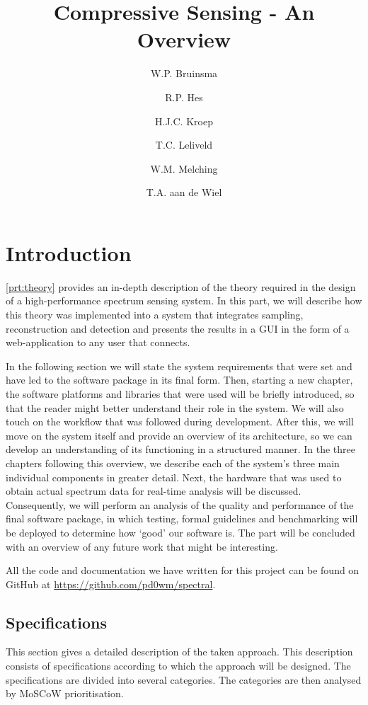 \documentclass[a4paper, openany, oneside]{memoir}
\title{Compressive Sensing - An Overview}
\author{W.P. Bruinsma \and R.P. Hes \and H.J.C. Kroep \and T.C. Leliveld \and W.M. Melching \and T.A. aan de Wiel}
\begin{document}
\chapter{Introduction}
\cref{prt:theory} provides an in-depth description of the theory required in the design of a high-performance spectrum sensing system.
In this part, we will describe how this theory was implemented into a system that integrates sampling, reconstruction and detection and presents the results in a GUI in the form of a web-application to any user that connects.

In the following section we will state the system requirements that were set and have led to the software package in its final form. Then, starting a new chapter, the software platforms and libraries that were used will be briefly introduced, so that the reader might better understand their role in the system. We will also touch on the workflow that was followed during development. After this, we will move on the system itself and provide an overview of its architecture, so we can develop an understanding of its functioning in a structured manner. In the three chapters following this overview, we describe each of the system's three main individual components in greater detail. Next, the hardware that was used to obtain actual spectrum data for real-time analysis will be discussed. Consequently, we will perform an analysis of the quality and performance of the final software package, in which testing, formal guidelines and benchmarking will be deployed to determine how `good' our software is. The part will be concluded with an overview of any future work that might be interesting.

All the code and documentation we have written for this project can be found on GitHub at \url{https://github.com/pd0wm/spectral}.

\section{Specifications}
\label{sec:implementation-specs}
This section gives a detailed description of the taken approach. This description consists of specifications according to which the approach will be designed. The specifications are divided into several categories. The categories are then analysed by MoSCoW prioritisation.
\end{document}
